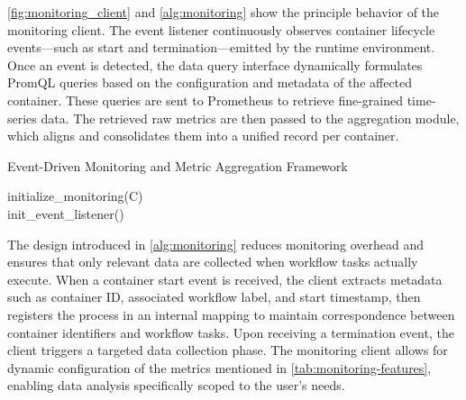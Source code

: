 \ref{fig:monitoring_client} and \ref{alg:monitoring} show the principle behavior of the monitoring client. The event listener continuously observes container lifecycle events—such as start and termination—emitted by the runtime environment. Once an event is detected, the data query interface dynamically formulates PromQL queries based on the configuration and metadata of the affected container. These queries are sent to Prometheus to retrieve fine-grained time-series data. The retrieved raw metrics are then passed to the aggregation module, which aligns and consolidates them into a unified record per container.

\begin{algorithm}[H]
    \caption{Event-Driven Monitoring and Metric Aggregation Framework}
    \label{alg:monitoring}

    \BlankLine
    initialize\_monitoring(C)\\
    init\_event\_listener()\\
\end{algorithm}

The design introduced in \ref{alg:monitoring} reduces monitoring overhead and ensures that only relevant data are collected when workflow tasks actually execute. When a container start event is received, the client extracts metadata such as container ID, associated workflow label, and start timestamp, then registers the process in an internal mapping to maintain correspondence between container identifiers and workflow tasks. Upon receiving a termination event, the client triggers a targeted data collection phase. The monitoring client allows for dynamic configuration of the metrics mentioned in \ref{tab:monitoring-features}, enabling data analysis specifically scoped to the user's needs.


